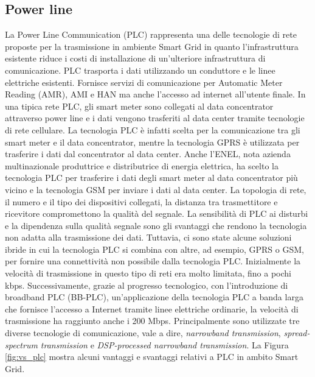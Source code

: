 \subsection{Power line}
La Power Line Communication (PLC) rappresenta una delle tecnologie di rete proposte per la trasmissione in ambiente Smart Grid in quanto l'infrastruttura esistente riduce i costi di installazione di un'ulteriore infrastruttura di comunicazione. PLC trasporta i dati utilizzando un conduttore e le linee elettriche esistenti. Fornisce servizi di comunicazione per Automatic Meter Reading (AMR), AMI e HAN ma anche l'accesso ad internet all'utente finale. In una tipica rete PLC, gli smart meter sono collegati al data concentrator attraverso power line e i dati vengono trasferiti al data center tramite tecnologie di rete cellulare. La tecnologia PLC è infatti scelta per la comunicazione tra gli smart meter e il data concentrator, mentre la tecnologia GPRS è utilizzata per trasferire i dati dal concentrator al data center. Anche l'ENEL, nota azienda multinazionale produttrice e distributrice di energia elettrica, ha scelto la tecnologia PLC per trasferire i dati degli smart meter al data concentrator più vicino e la tecnologia GSM per inviare i dati al data center. 
La topologia di rete, il numero e il tipo dei dispositivi collegati, la distanza tra trasmettitore e ricevitore compromettono la qualità del segnale. La sensibilità di PLC ai disturbi e la dipendenza sulla qualità segnale sono gli svantaggi che rendono la tecnologia non adatta alla trasmissione dei dati. Tuttavia, ci sono state alcune soluzioni ibride in cui la tecnologia PLC si combina con altre, ad esempio, GPRS o GSM, per fornire una connettività non possibile dalla tecnologia PLC. Inizialmente la velocità di trasmissione in questo tipo di reti era molto limitata, fino a pochi kbps. Successivamente, grazie al progresso tecnologico, con l'introduzione di broadband PLC (BB-PLC), un'applicazione della tecnologia PLC a banda larga che fornisce l'accesso a Internet tramite linee elettriche ordinarie, la velocità di trasmissione ha raggiunto anche i 200 Mbps. Principalmente sono utilizzate tre diverse tecnologie di comunicazione, vale a dire, \emph{narrowband transmission}, \emph{spread-spectrum transmission} e \emph{DSP-processed narrowband transmission}. La Figura \ref{fig:vs_plc} mostra alcuni vantaggi e svantaggi relativi a PLC in ambito Smart Grid.
